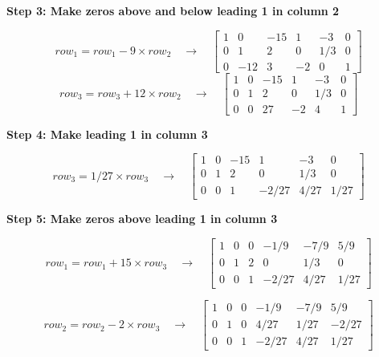 \noindent \textbf{Step 3: Make zeros above and below leading 1 in column 2}

\[
    row_1 = row_1 - 9 \times row_2 \quad \rightarrow \quad \left[
        \begin{array}{ccc|ccc}
            1 & 0   & -15 & 1  & -3  & 0 \\
            0 & 1   & 2   & 0  & 1/3 & 0 \\
            0 & -12 & 3   & -2 & 0   & 1
        \end{array}
        \right]
\]
\[
    row_3 = row_3 + 12 \times row_2 \quad \rightarrow \quad \left[
        \begin{array}{ccc|ccc}
            1 & 0 & -15 & 1  & -3  & 0 \\
            0 & 1 & 2   & 0  & 1/3 & 0 \\
            0 & 0 & 27  & -2 & 4   & 1
        \end{array}
        \right]
\]

\noindent \textbf{Step 4: Make leading 1 in column 3}

\[
    row_3 = 1/27 \times row_3  \quad \rightarrow \quad \left[
        \begin{array}{ccc|ccc}
            1 & 0 & -15 & 1     & -3   & 0    \\
            0 & 1 & 2   & 0     & 1/3  & 0    \\
            0 & 0 & 1   & -2/27 & 4/27 & 1/27
        \end{array}
        \right]
\]

\noindent \textbf{Step 5: Make zeros above leading 1 in column 3}

\[
    row_1 = row_1 + 15 \times row_3  \quad \rightarrow \quad \left[
        \begin{array}{ccc|ccc}
            1 & 0 & 0 & -1/9  & -7/9 & 5/9  \\
            0 & 1 & 2 & 0     & 1/3  & 0    \\
            0 & 0 & 1 & -2/27 & 4/27 & 1/27
        \end{array}
        \right]
\]

\[
    row_2 = row_2 -2 \times row_3  \quad \rightarrow \quad \left[
        \begin{array}{ccc|ccc}
            1 & 0 & 0 & -1/9  & -7/9 & 5/9   \\
            0 & 1 & 0 & 4/27  & 1/27 & -2/27 \\
            0 & 0 & 1 & -2/27 & 4/27 & 1/27
        \end{array}
        \right]
\]


